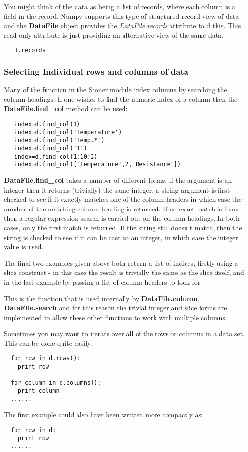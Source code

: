 \documentclass[a4paper,11pt]{scrartcl}
\begin{document}
You might think of the data as being a list of records, where each column is a
field in the record. Numpy supports this type of structured record view of data
and the \textbf{DataFile} object provides the \textit{DataFile.records}
attribute to d this. This read-only attribute is just providing an alternative
view of the same data.

\begin{lstlisting}
   d.records
\end{lstlisting}

\subsubsection{Selecting Individual rows and columns of data}

Many of the function in the Stoner module index columns by searching the column
headings. If one wishes to find the numeric index of a column then the
\textbf{DataFile.find\_col} method can be used:

\begin{lstlisting}
   index=d.find_col(1)
   index=d.find_col('Temperature')
   index=d.find_col('Temp.*')
   index=d.find_col('1')
   index=d.find_col(1:10:2)
   index=d.find_col(['Temperature',2,'Resistance'])
\end{lstlisting}

 \textbf{DataFile.find\_col} takes a number of different forms. If the argument
is an integer then it returns (trivially) the same integer, a string argument is
first checked to see if it exactly matches one of the column headers in which
case the number of the matching column heading is returned. If no exact match is
found then a regular expression search is carried out on the column headings. In
both cases, only the first match is returned. If the string still doesn't match, then
the string is checked to see if it can be cast to an integer, in which case the integer value is used.

The final two examples given above
both return a list of indices, firstly using a slice construct - in this case
the result is trivially the same as the slice itself, and in the last example by
passing a list of column headers to look for.

This is the function that is used internally by \textbf{DataFile.column},
\textbf{DataFile.search} \etc and for this reason the trivial integer and slice
forms are implemented to allow these other functions to work with multiple
columns.

Sometimes you may want to iterate over all of the rows or columns in a data set.
This can be done quite easily:
\begin{lstlisting}
  for row in d.rows():
  	print row
  
  for column in d.columns():
  	print column
  ......
\end{lstlisting}
The first example could also have been written more compactly as:
\begin{lstlisting}
  for row in d:
  	print row
  ......
\end{lstlisting}
\end{document}

